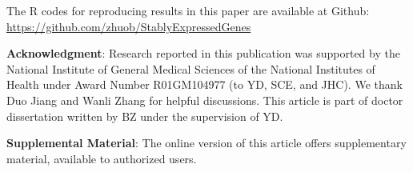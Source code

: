 \documentclass[letterpaper,12pt]{article}
\begin{document}
The R codes for reproducing results in this paper are available at Github:
\url{https://github.com/zhuob/StablyExpressedGenes}

\textbf{Acknowledgment}: Research reported in this publication was supported by the National Institute of General Medical Sciences of the National Institutes of Health under Award Number R01GM104977 (to YD, SCE, and JHC). We thank Duo Jiang and Wanli Zhang for helpful discussions. This article is part of doctor dissertation written by BZ under the supervision of YD. 

\textbf{Supplemental Material}: The online version of this article offers supplementary material,
available to authorized users.






%
%
\end{document}
